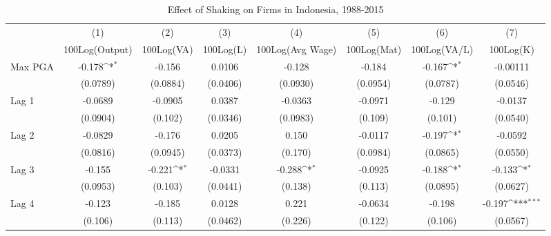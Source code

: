 \begin{table}[htbp]\centering
\def\sym#1{\ifmmode^{#1}\else\(^{#1}\)\fi}
\caption{Effect of Shaking on Firms in Indonesia, 1988-2015}
\begin{tabular}{l*{7}{c}}
\toprule
                &\multicolumn{1}{c}{(1)}&\multicolumn{1}{c}{(2)}&\multicolumn{1}{c}{(3)}&\multicolumn{1}{c}{(4)}&\multicolumn{1}{c}{(5)}&\multicolumn{1}{c}{(6)}&\multicolumn{1}{c}{(7)}\\
                &\multicolumn{1}{c}{100Log(Output)}&\multicolumn{1}{c}{100Log(VA)}&\multicolumn{1}{c}{100Log(L)}&\multicolumn{1}{c}{100Log(Avg Wage)}&\multicolumn{1}{c}{100Log(Mat)}&\multicolumn{1}{c}{100Log(VA/L)}&\multicolumn{1}{c}{100Log(K)}\\
\midrule
Max PGA         &   -0.178\sym{*}  &   -0.156         &   0.0106         &   -0.128         &   -0.184         &   -0.167\sym{*}  & -0.00111         \\
                & (0.0789)         & (0.0884)         & (0.0406)         & (0.0930)         & (0.0954)         & (0.0787)         & (0.0546)         \\
\addlinespace
Lag 1           &  -0.0689         &  -0.0905         &   0.0387         &  -0.0363         &  -0.0971         &   -0.129         &  -0.0137         \\
                & (0.0904)         &  (0.102)         & (0.0346)         & (0.0983)         &  (0.109)         &  (0.101)         & (0.0540)         \\
\addlinespace
Lag 2           &  -0.0829         &   -0.176         &   0.0205         &    0.150         &  -0.0117         &   -0.197\sym{*}  &  -0.0592         \\
                & (0.0816)         & (0.0945)         & (0.0373)         &  (0.170)         & (0.0984)         & (0.0865)         & (0.0550)         \\
\addlinespace
Lag 3           &   -0.155         &   -0.221\sym{*}  &  -0.0331         &   -0.288\sym{*}  &  -0.0925         &   -0.188\sym{*}  &   -0.133\sym{*}  \\
                & (0.0953)         &  (0.103)         & (0.0441)         &  (0.138)         &  (0.113)         & (0.0895)         & (0.0627)         \\
\addlinespace
Lag 4           &   -0.123         &   -0.185         &   0.0128         &    0.221         &  -0.0634         &   -0.198         &   -0.197\sym{***}\\
                &  (0.106)         &  (0.113)         & (0.0462)         &  (0.226)         &  (0.122)         &  (0.106)         & (0.0567)         \\

\end{tabular}
\end{table}
